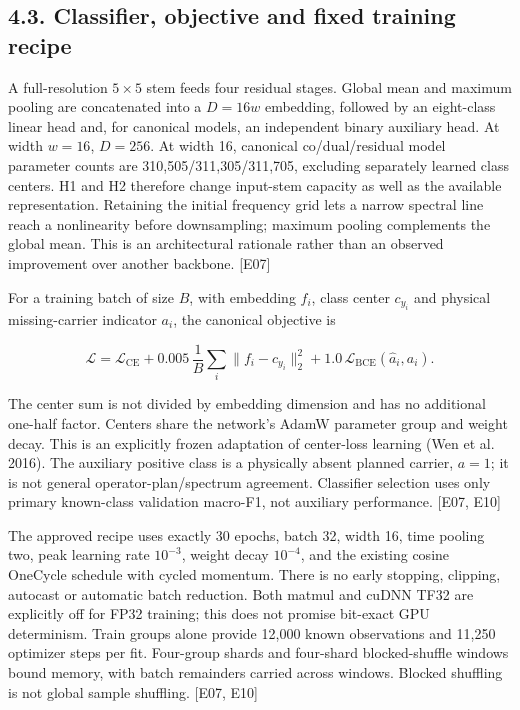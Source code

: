 \documentclass[
  10pt,
]{article}
\begin{document}
\subsection{4.3. Classifier, objective and fixed training
recipe}\label{classifier-objective-and-fixed-training-recipe}

A full-resolution \(5\times5\) stem feeds four residual stages. Global
mean and maximum pooling are concatenated into a \(D=16w\) embedding,
followed by an eight-class linear head and, for canonical models, an
independent binary auxiliary head. At width \(w=16\), \(D=256\). At
width 16, canonical co/dual/residual model parameter counts are
310,505/311,305/311,705, excluding separately learned class centers. H1
and H2 therefore change input-stem capacity as well as the available
representation. Retaining the initial frequency grid lets a narrow
spectral line reach a nonlinearity before downsampling; maximum pooling
complements the global mean. This is an architectural rationale rather
than an observed improvement over another backbone. {[}E07{]}

For a training batch of size \(B\), with embedding \(f_i\), class center
\(c_{y_i}\) and physical missing-carrier indicator \(a_i\), the
canonical objective is

\[\mathcal L=\mathcal L_{\mathrm{CE}}+0.005\,\frac1B\sum_i\|f_i-c_{y_i}\|_2^2+1.0\,\mathcal L_{\mathrm{BCE}}(\widehat a_i,a_i).\]

The center sum is not divided by embedding dimension and has no
additional one-half factor. Centers share the network's AdamW parameter
group and weight decay. This is an explicitly frozen adaptation of
center-loss learning (Wen et al. 2016). The auxiliary positive class is
a physically absent planned carrier, \(a=1\); it is not general
operator-plan/spectrum agreement. Classifier selection uses only primary
known-class validation macro-F1, not auxiliary performance. {[}E07,
E10{]}

The approved recipe uses exactly 30 epochs, batch 32, width 16, time
pooling two, peak learning rate \(10^{-3}\), weight decay \(10^{-4}\),
and the existing cosine OneCycle schedule with cycled momentum. There is
no early stopping, clipping, autocast or automatic batch reduction. Both
matmul and cuDNN TF32 are explicitly off for FP32 training; this does
not promise bit-exact GPU determinism. Train groups alone provide 12,000
known observations and 11,250 optimizer steps per fit. Four-group shards
and four-shard blocked-shuffle windows bound memory, with batch
remainders carried across windows. Blocked shuffling is not global
sample shuffling. {[}E07, E10{]}
\end{document}

